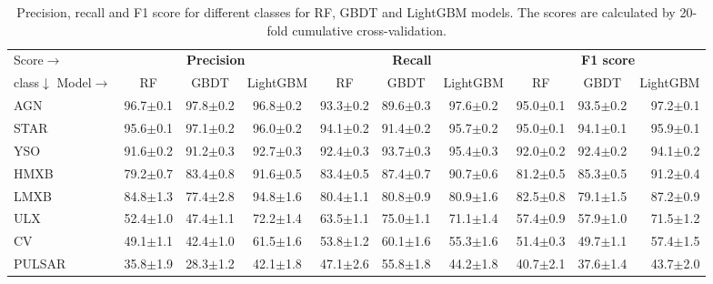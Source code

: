 \documentclass[fleqn,usenatbib]{mnras}
\begin{document}
    \begin{table}
        \centering
        \caption{Precision, recall and F1 score for different classes for RF, GBDT and LightGBM models. The scores are calculated by 20-fold cumulative cross-validation.}
        \label{tab:model-comp-class}
        \begin{tabular}{lccccccccr}
        \hline
        Score$\rightarrow$ & \multicolumn{3}{c}{\textbf{Precision}}  & \multicolumn{3}{c}{\textbf{Recall}}     & \multicolumn{3}{c}{\textbf{F1 score}}  \\
        class$\downarrow$ Model$\rightarrow$ & RF            & GBDT     & LightGBM              & RF           & GBDT         & LightGBM        & RF           & GBDT     & LightGBM      \\ \hline
        AGN                                  & 96.7$\pm$0.1  & 97.8$\pm$0.2 & 96.8$\pm$0.2      & 93.3$\pm$0.2 & 89.6$\pm$0.3 & 97.6$\pm$0.2    & 95.0$\pm$0.1 & 93.5$\pm$0.2 & 97.2$\pm$0.1 \\
        STAR                                 & 95.6$\pm$0.1  & 97.1$\pm$0.2 & 96.0$\pm$0.2      & 94.1$\pm$0.2 & 91.4$\pm$0.2 & 95.7$\pm$0.2    & 95.0$\pm$0.1 & 94.1$\pm$0.1 & 95.9$\pm$0.1 \\
        YSO                                  & 91.6$\pm$0.2  & 91.2$\pm$0.3 & 92.7$\pm$0.3      & 92.4$\pm$0.3 & 93.7$\pm$0.3 & 95.4$\pm$0.3    & 92.0$\pm$0.2 & 92.4$\pm$0.2 & 94.1$\pm$0.2 \\
        HMXB                                 & 79.2$\pm$0.7  & 83.4$\pm$0.8 & 91.6$\pm$0.5      & 83.4$\pm$0.5 & 87.4$\pm$0.7 & 90.7$\pm$0.6    & 81.2$\pm$0.5 & 85.3$\pm$0.5 & 91.2$\pm$0.4 \\
        LMXB                                 & 84.8$\pm$1.3  & 77.4$\pm$2.8 & 94.8$\pm$1.6      & 80.4$\pm$1.1 & 80.8$\pm$0.9 & 80.9$\pm$1.6    & 82.5$\pm$0.8 & 79.1$\pm$1.5 & 87.2$\pm$0.9 \\
        ULX                                  & 52.4$\pm$1.0  & 47.4$\pm$1.1 & 72.2$\pm$1.4      & 63.5$\pm$1.1 & 75.0$\pm$1.1 & 71.1$\pm$1.4    & 57.4$\pm$0.9 & 57.9$\pm$1.0 & 71.5$\pm$1.2 \\
        CV                                   & 49.1$\pm$1.1  & 42.4$\pm$1.0 & 61.5$\pm$1.6      & 53.8$\pm$1.2 & 60.1$\pm$1.6 & 55.3$\pm$1.6    & 51.4$\pm$0.3 & 49.7$\pm$1.1 & 57.4$\pm$1.5 \\
        PULSAR                               & 35.8$\pm$1.9  & 28.3$\pm$1.2 & 42.1$\pm$1.8      & 47.1$\pm$2.6 & 55.8$\pm$1.8 & 44.2$\pm$1.8    & 40.7$\pm$2.1 & 37.6$\pm$1.4 & 43.7$\pm$2.0 \\ \hline
        \end{tabular}
    \end{table}
    
\end{document}
